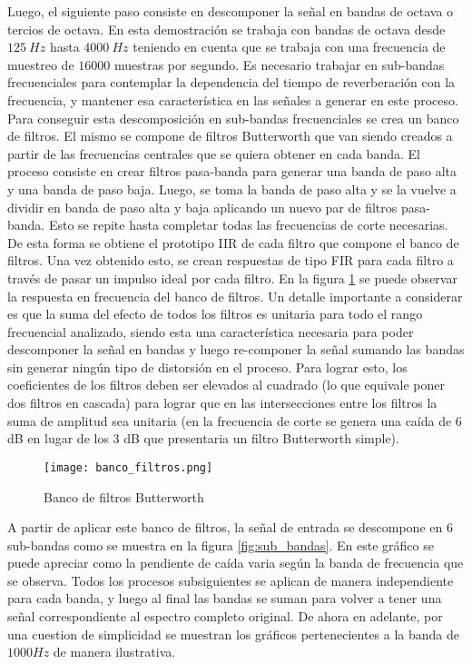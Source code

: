 Luego, el siguiente paso consiste en descomponer la señal en bandas de octava o tercios de octava. En esta demostración se trabaja con bandas de octava desde $125 \ Hz$ hasta $4000 \ Hz$ teniendo en cuenta que se trabaja con una frecuencia de muestreo de $16000$ muestras por segundo. Es necesario trabajar en sub-bandas frecuenciales para contemplar la dependencia del tiempo de reverberación con la frecuencia, y mantener esa característica en las señales a generar en este proceso. Para conseguir esta descomposición en sub-bandas frecuenciales se crea un banco de filtros. El mismo se compone de filtros Butterworth que van siendo creados a partir de las frecuencias centrales que se quiera obtener en cada banda. El proceso consiste en crear filtros pasa-banda para generar una banda de paso alta y una banda de paso baja. Luego, se toma la banda de paso alta y se la vuelve a dividir en banda de paso alta y baja aplicando un nuevo par de filtros pasa-banda. Esto se repite hasta completar todas las frecuencias de corte necesarias. De esta forma se obtiene el prototipo IIR de cada filtro que compone el banco de filtros. Una vez obtenido esto, se crean respuestas de tipo FIR para cada filtro a través de pasar un impulso ideal por cada filtro. En la figura \ref{fig:banco_filtros} se puede observar la respuesta en frecuencia del banco de filtros. Un detalle importante a considerar es que la suma del efecto de todos los filtros es unitaria para todo el rango frecuencial analizado, siendo esta una característica necesaria para poder descomponer la señal en bandas y luego re-componer la señal sumando las bandas sin generar ningún tipo de distorsión en el proceso. Para lograr esto, los coeficientes de los filtros deben ser elevados al cuadrado (lo que equivale poner dos filtros en cascada) para lograr que en las intersecciones entre los filtros la suma de amplitud sea unitaria (en la frecuencia de corte se genera una caída de 6 dB en lugar de los 3 dB que presentaria un filtro Butterworth simple). 

\begin{figure}[H]
	\centering{}
	\texttt{[image: banco\_filtros.png]}
	\caption{Banco de filtros Butterworth}
	\label{fig:banco_filtros}
\end{figure}

A partir de aplicar este banco de filtros, la señal de entrada se descompone en 6 sub-bandas como se muestra en la figura \ref{fig:sub_bandas}. En este gráfico se puede apreciar como la pendiente de caída varia según la banda de frecuencia que se observa. Todos los procesos subsiguientes se aplican de manera independiente para cada banda, y luego al final las bandas se suman para volver a tener una señal correspondiente al espectro completo original. De ahora en adelante, por una cuestion de simplicidad se muestran los gráficos pertenecientes a la banda de $1000 Hz$ de manera ilustrativa.

